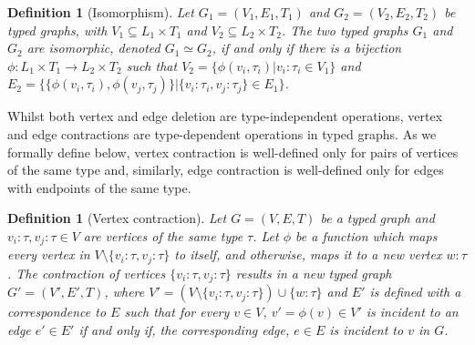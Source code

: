\documentclass[preprint,12pt]{elsarticle}
\theoremstyle{plain}
\newtheorem{definition}[theorem]{Definition}
\newcommand\tyv[2]{#1\!\!:\!\!#2}
\begin{document}


\begin{definition}[Isomorphism]
Let $G_1 = (V_1,E_1,T_1)$ and $G_2 = (V_2,E_2,T_2)$ be typed graphs,
with $V_1 \subseteq L_1\times T_1$ and $V_2 \subseteq L_2\times T_2$.
The two typed graphs $G_1$ and $G_2$ are isomorphic, denoted $G_1 \simeq G_2$,
if and only if there is a bijection $\phi:L_1 \times T_1 \rightarrow L_2 \times T_2 $
such that
$V_2 = \{{\phi(v_i,\tau_i)}|\tyv{v_i}{\tau_i}\in V_1\}$ and
$E_2 = \{ \{{\phi(v_i,\tau_i)}, {\phi(v_j,\tau_j)}\} | \{\tyv{v_i}{\tau_i}, \tyv{v_j}{\tau_j}\}\in E_1 \}$.
\end{definition}

Whilst both vertex and edge deletion are type-independent operations,
vertex and edge contractions are type-dependent operations in
typed graphs. As we formally define below,
vertex contraction is well-defined only for pairs of vertices of the same type
and, similarly, edge contraction is well-defined only for edges with endpoints of the same type.

\begin{definition}[Vertex contraction]
Let $G = (V,E,T)$ be a typed graph
and $\tyv{v_i}{\tau},\tyv{v_j}{\tau}\in V$ are vertices of the same type $\tau$.
Let $\phi$ be a function which maps every vertex in $V\setminus\{\tyv{v_i}{\tau}, \tyv{v_j}{\tau}\}$ to itself, and otherwise,
maps it to a new vertex $\tyv{w}{\tau}$.
The contraction of vertices $\{\tyv{v_i}{\tau}, \tyv{v_j}{\tau}\}$ results in a new typed graph
$G'=(V',E',T)$,
where $V'=(V\setminus\{\tyv{v_i}{\tau}, \tyv{v_j}{\tau}\})\cup\{\tyv{w}{\tau}\}$ and $E'$ is defined with a correspondence to $E$ such that
for every $v\in V$, $v'=\phi(v)\in V'$ is incident to an edge $e'\in E'$ if and only if, the corresponding edge, $e\in E$ is incident to $v$ in $G$.
\end{definition}
\end{document}
